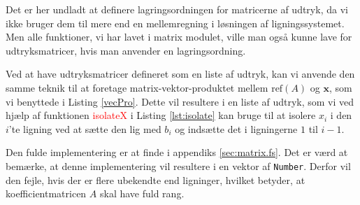 Det er her undladt at definere lagringsordningen for matricerne af udtryk, da vi ikke bruger dem til mere end en mellemregning i løsningen af ligningssystemet. Men alle funktioner, vi har lavet i matrix modulet, ville man også kunne lave for udtryksmatricer, hvis man anvender en lagringsordning.

Ved at have udtryksmatricer defineret som en liste af udtryk, kan vi anvende den samme teknik til at foretage matrix-vektor-produktet mellem \(\text{ref}(A)\) og \(\mathbf{x}\), som vi benyttede i Listing \ref{vecPro}. Dette vil resultere i en liste af udtryk, som vi ved hjælp af funktionen \textcolor{red}{isolateX} i Listing \ref{lst:isolate} kan bruge til at isolere \(x_i\) i den \(i\)'te ligning ved at sætte den lig med $b_i$ og indsætte det i ligningerne \(1\) til \(i - 1\).

Den fulde implementering er at finde i appendiks \ref{sec:matrix.fs}. Det er værd at bemærke, at denne implementering vil resultere i en vektor af \texttt{Number}. Derfor vil den fejle, hvis der er flere ubekendte end ligninger, hvilket betyder, at koefficientmatricen $A$ skal have fuld rang.




